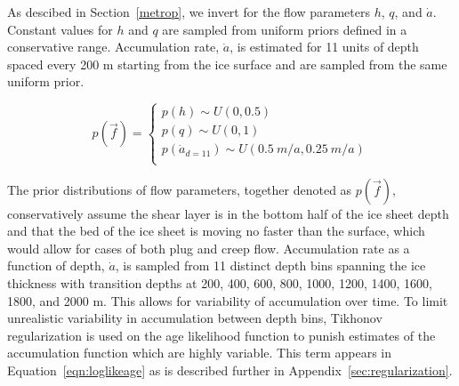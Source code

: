 As descibed in Section~\ref{metrop}, we invert for the flow parameters $h$, $q$, and $\dot{a}$. Constant values for $h$ and $q$ are sampled from uniform priors defined in a conservative range. Accumulation rate, $\dot{a}$, is estimated for 11 units of depth spaced every 200 m starting from the ice surface and are sampled from the same uniform prior.

\begin{center}
\begin{equation}
p(\vec{f}) = 
\begin{cases}
p(h) \sim U(0, 0.5) \\
p(q) \sim U (0, 1) \\
p(\dot{a}_{d=11}) \sim U(0.5~m/a,0.25~m/a)\\
\end{cases}	
\end{equation}	
\end{center}

The prior distributions of flow parameters, together denoted as $p(\vec{f})$, conservatively assume the shear layer is in the bottom half of the ice sheet depth \citep{cuffey2010} and that the bed of the ice sheet is moving no faster than the surface, which would allow for cases of both plug and creep flow. Accumulation rate as a function of depth, $\dot{a}$, is sampled from 11 distinct depth bins spanning the ice thickness with transition depths at 200, 400, 600, 800, 1000, 1200, 1400, 1600, 1800, and 2000 m. This allows for variability of accumulation over time. To limit unrealistic variability in accumulation between depth bins, Tikhonov regularization is used on the age likelihood function to punish estimates of the accumulation function which are highly variable. This term appears in Equation~\ref{eqn:loglikeage} as is described further in Appendix~\ref{sec:regularization}.
